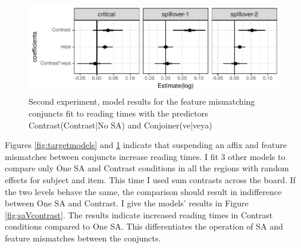 \begin{knitrout}
\color{fgcolor}\begin{figure}[hbt!]

{\centering \includegraphics[]{experiments/selfpaced/report/figure/contrastmodels-1.pdf} 

}

\caption[Second experiment, model results for the feature mismatching conjuncts fit to reading times with the predictors Contrast(Contrast|No SA) and Conjoiner(ve|veya)]{Second experiment, model results for the feature mismatching conjuncts fit to reading times with the predictors Contrast(Contrast|No SA) and Conjoiner(ve|veya)}\label{fig:contrastmodels}
\end{figure}


\end{knitrout}

Figures \ref{fig:targetmodels} and \ref{fig:contrastmodels} indicate that suspending an affix and feature mismatches between conjuncts increase reading times. I fit 3 other models to compare only One SA and Contrast conditions in all the regions with random effects for subject and item. This time I used sum contrasts across the board. If the two levels behave the same, the comparison should result in indifference between One SA and Contrast. I give the models' results in Figure \ref{fig:saVcontrast}. The results indicate increased reading times in Contrast conditions compared to One SA. This differentiates the operation of SA and feature mismatches between the conjuncts. 

